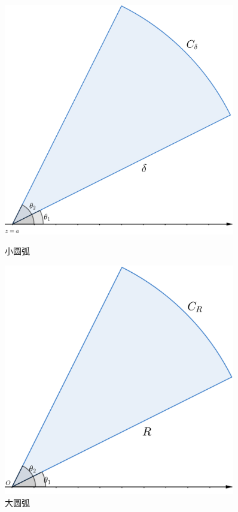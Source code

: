 \documentclass[lang=cn, titlestyle=display, scheme=chinese]{elegantbook}
\begin{document}
                \begin{figure}[htbp]
                    \centering
                    \begin{minipage}[t]{0.48\textwidth}
                        \centering
                        \includegraphics[width=0.9\textwidth]{SmallArc.png}
                        \caption{小圆弧}
                        \label{fig:small_arc}
                    \end{minipage}
                    \begin{minipage}[t]{0.48\textwidth}
                        \centering
                        \includegraphics[width=0.9\textwidth]{LargeArc.png}
                        \caption{大圆弧}
                        \label{fig:large_arc}
                    \end{minipage}
                \end{figure}
\end{document}
